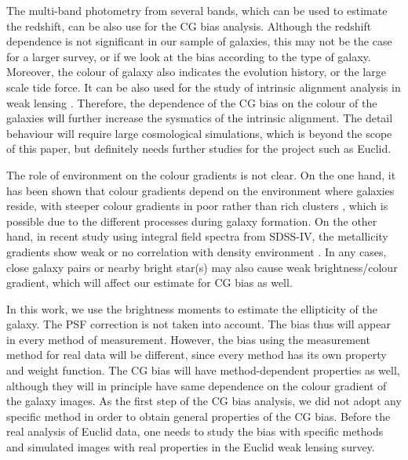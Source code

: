 \documentclass[useAMS,usenatbib]{mnras}
\begin{document}
The multi-band photometry from several bands, which can be used to
estimate the redshift, can be also use for the CG bias analysis.
Although the redshift dependence is not significant in our sample of
galaxies, this may not be the case for a larger survey, or if we look
at the bias according to the type of galaxy. Moreover, the colour of
galaxy also indicates the evolution history, or the large scale tide
force.  It can be also used for the study of intrinsic alignment
analysis in weak lensing \citep[e.g.][]{2015SSRv..193....1J}.
Therefore, the dependence of the CG bias on the colour of the galaxies
will further increase the sysmatics of the intrinsic alignment. The
detail behaviour will require large cosmological simulations, which is
beyond the scope of this paper, but definitely needs further studies for
the project such as Euclid.

The role of environment on the colour gradients is not clear. On the
one hand, it has been shown that colour gradients depend on the
environment where galaxies reside, with steeper colour gradients in
poor rather than rich clusters \citep[e.g.][]{2005ApJ...626L..19L},
which is possible due to the different processes during galaxy
formation. On the other hand, in recent study using integral field
spectra from SDSS-IV, the metallicity gradients show weak or no
correlation with density environment \citep{2017MNRAS.465.4572Z}. In
any cases, close galaxy pairs or nearby bright star(s) may also cause
weak brightness/colour gradient, which will affect our estimate for CG
bias as well. 

In this work, we use the brightness moments to estimate the
ellipticity of the galaxy. The PSF correction is not taken into
account. The bias thus will appear in every method of measurement.
However, the bias using the measurement method for real data
will be different, since every method has its own property and weight
function. The CG bias will have method-dependent properties as well,
although they will in principle have same dependence on the colour
gradient of the galaxy images. As the first step of the CG bias
analysis, we did not adopt any specific method in order to obtain
general properties of the CG bias. Before the real analysis of Euclid
data, one needs to study the bias with specific methods and simulated
images with real properties in the Euclid weak lensing survey.

%
\end{document}
